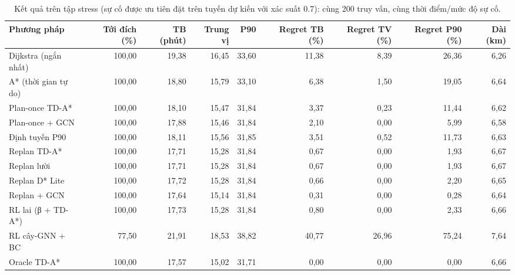 \begin{table}[!htbp]
\centering
\small
\caption{Kết quả trên tập stress (sự cố được ưu tiên đặt trên tuyến dự kiến với xác suất 0.7): cùng 200 truy vấn, cùng thời điểm/mức độ sự cố.}
\label{tab:tab_stress}
\begin{adjustbox}{max width=\linewidth}
\begin{tabular}{lrrrrrrrr}
\toprule
Phương pháp & Tới đích (\%) & TB (phút) & Trung vị & P90 & Regret TB (\%) & Regret TV (\%) & Regret P90 (\%) & Dài (km) \\
\midrule
Dijkstra (ngắn nhất) & 100{,}00 & 19{,}38 & 16{,}45 & 33{,}60 & 11{,}38 & 8{,}39 & 26{,}36 & 6{,}26 \\
A* (thời gian tự do) & 100{,}00 & 18{,}80 & 15{,}79 & 33{,}10 & 6{,}38 & 1{,}50 & 19{,}05 & 6{,}64 \\
Plan-once TD-A* & 100{,}00 & 18{,}10 & 15{,}47 & 31{,}84 & 3{,}37 & 0{,}23 & 11{,}44 & 6{,}62 \\
Plan-once + GCN & 100{,}00 & 17{,}88 & 15{,}46 & 31{,}84 & 2{,}10 & 0{,}00 & 5{,}99 & 6{,}58 \\
Định tuyến P90 & 100{,}00 & 18{,}11 & 15{,}56 & 31{,}85 & 3{,}51 & 0{,}52 & 11{,}73 & 6{,}63 \\
Replan TD-A* & 100{,}00 & 17{,}71 & 15{,}28 & 31{,}84 & 0{,}67 & 0{,}00 & 1{,}93 & 6{,}67 \\
Replan lười & 100{,}00 & 17{,}71 & 15{,}28 & 31{,}84 & 0{,}67 & 0{,}00 & 1{,}93 & 6{,}67 \\
Replan D* Lite & 100{,}00 & 17{,}72 & 15{,}28 & 31{,}84 & 0{,}66 & 0{,}00 & 2{,}20 & 6{,}65 \\
Replan + GCN & 100{,}00 & 17{,}64 & 15{,}14 & 31{,}84 & 0{,}31 & 0{,}00 & 0{,}28 & 6{,}64 \\
RL lai (β + TD-A*) & 100{,}00 & 17{,}73 & 15{,}28 & 31{,}84 & 0{,}80 & 0{,}00 & 2{,}33 & 6{,}66 \\
RL cây-GNN + BC & 77{,}50 & 21{,}91 & 18{,}53 & 38{,}82 & 40{,}77 & 26{,}96 & 75{,}24 & 7{,}64 \\
Oracle TD-A* & 100{,}00 & 17{,}57 & 15{,}02 & 31{,}71 & 0{,}00 & 0{,}00 & 0{,}00 & 6{,}66 \\
\bottomrule
\end{tabular}
\end{adjustbox}
\end{table}

